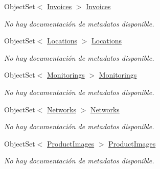 \begin{DoxyCompactItemize}
Object\-Set$<$ \hyperlink{class_game_memory_1_1_invoices}{Invoices} $>$ \hyperlink{class_game_memory_1_1_o_m_k_t_d_b_entities_a5f476d54b5516d130b85937f55d63fbd}{Invoices}
\begin{DoxyCompactList}\small\item\em No hay documentación de metadatos disponible. \end{DoxyCompactList}\item 
Object\-Set$<$ \hyperlink{class_game_memory_1_1_locations}{Locations} $>$ \hyperlink{class_game_memory_1_1_o_m_k_t_d_b_entities_a4b8ec3058d7f5a515cf9bc9681f1191a}{Locations}
\begin{DoxyCompactList}\small\item\em No hay documentación de metadatos disponible. \end{DoxyCompactList}\item 
Object\-Set$<$ \hyperlink{class_game_memory_1_1_monitorings}{Monitorings} $>$ \hyperlink{class_game_memory_1_1_o_m_k_t_d_b_entities_a003abae33bc7aceca33711191c9d20a3}{Monitorings}
\begin{DoxyCompactList}\small\item\em No hay documentación de metadatos disponible. \end{DoxyCompactList}\item 
Object\-Set$<$ \hyperlink{class_game_memory_1_1_networks}{Networks} $>$ \hyperlink{class_game_memory_1_1_o_m_k_t_d_b_entities_ac362cc17f97a3d750ba0b99718919634}{Networks}
\begin{DoxyCompactList}\small\item\em No hay documentación de metadatos disponible. \end{DoxyCompactList}\item 
Object\-Set$<$ \hyperlink{class_game_memory_1_1_product_images}{Product\-Images} $>$ \hyperlink{class_game_memory_1_1_o_m_k_t_d_b_entities_a5737285ce03f1aa6de7115c37bd4eb1d}{Product\-Images}
\begin{DoxyCompactList}\small\item\em No hay documentación de metadatos disponible. \end{DoxyCompactList}\item 

\end{DoxyCompactItemize}
